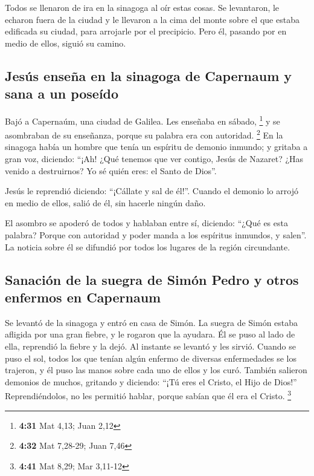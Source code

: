 \begin{paracol}{2}
 Todos se llenaron de ira en la sinagoga al oír estas
cosas.  Se levantaron, le echaron fuera de la ciudad y le
llevaron a la cima del monte sobre el que estaba edificada su ciudad,
para arrojarle por el precipicio.  Pero él, pasando por
en medio de ellos, siguió su camino.

\hypertarget{jesuxfas-enseuxf1a-en-la-sinagoga-de-capernaum-y-sana-a-un-poseuxeddo}{%
\subsection{Jesús enseña en la sinagoga de Capernaum y sana a un
poseído}\label{jesuxfas-enseuxf1a-en-la-sinagoga-de-capernaum-y-sana-a-un-poseuxeddo}}

 Bajó a Capernaúm, una ciudad de Galilea. Les enseñaba en
sábado, \footnote{\textbf{4:31} Mat 4,13; Juan 2,12}  y
se asombraban de su enseñanza, porque su palabra era con autoridad.
\footnote{\textbf{4:32} Mat 7,28-29; Juan 7,46}  En la
sinagoga había un hombre que tenía un espíritu de demonio inmundo; y
gritaba a gran voz,  diciendo: ``¡Ah! ¿Qué tenemos que
ver contigo, Jesús de Nazaret? ¿Has venido a destruirnos? Yo sé quién
eres: el Santo de Dios''.

 Jesús le reprendió diciendo: ``¡Cállate y sal de él!''.
Cuando el demonio lo arrojó en medio de ellos, salió de él, sin hacerle
ningún daño.

 El asombro se apoderó de todos y hablaban entre sí,
diciendo: ``¿Qué es esta palabra? Porque con autoridad y poder manda a
los espíritus inmundos, y salen''.  La noticia sobre él
se difundió por todos los lugares de la región circundante.

\hypertarget{sanaciuxf3n-de-la-suegra-de-simuxf3n-pedro-y-otros-enfermos-en-capernaum}{%
\subsection{Sanación de la suegra de Simón Pedro y otros enfermos en
Capernaum}\label{sanaciuxf3n-de-la-suegra-de-simuxf3n-pedro-y-otros-enfermos-en-capernaum}}

 Se levantó de la sinagoga y entró en casa de Simón. La
suegra de Simón estaba afligida por una gran fiebre, y le rogaron que la
ayudara.  Él se puso al lado de ella, reprendió la fiebre
y la dejó. Al instante se levantó y les sirvió.  Cuando
se puso el sol, todos los que tenían algún enfermo de diversas
enfermedades se los trajeron, y él puso las manos sobre cada uno de
ellos y los curó.  También salieron demonios de muchos,
gritando y diciendo: ``¡Tú eres el Cristo, el Hijo de Dios!''
Reprendiéndolos, no les permitió hablar, porque sabían que él era el
Cristo. \footnote{\textbf{4:41} Mat 8,29; Mar 3,11-12}


\end{paracol}
